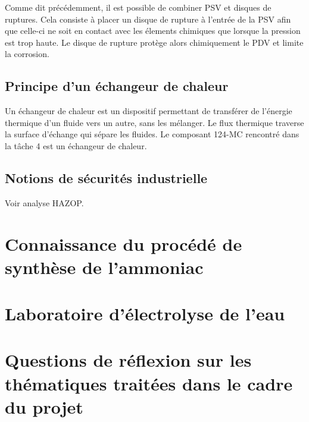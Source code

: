Comme dit précédemment, il est possible de combiner
PSV et disques de ruptures. Cela consiste à
placer un disque de rupture à l'entrée de la PSV
afin que celle-ci ne soit en contact avec les élements
chimiques que lorsque la pression est trop haute. Le
disque de rupture protège alors chimiquement le PDV et
limite la corrosion.

\subsection{Principe d'un échangeur de chaleur}
Un échangeur de chaleur est un dispositif permettant
de transférer de l'énergie thermique d'un fluide
vers un autre, sans les mélanger. Le flux thermique
traverse la surface d'échange qui sépare les fluides.
Le composant 124-MC rencontré dans la tâche 4 est un
échangeur de chaleur.

\subsection{Notions de sécurités industrielle}
Voir analyse HAZOP.

\section{Connaissance du procédé de synthèse de l'ammoniac}
\section{Laboratoire d'électrolyse de l'eau}
\section{Questions de réflexion sur les thématiques traitées
dans le cadre du projet}

